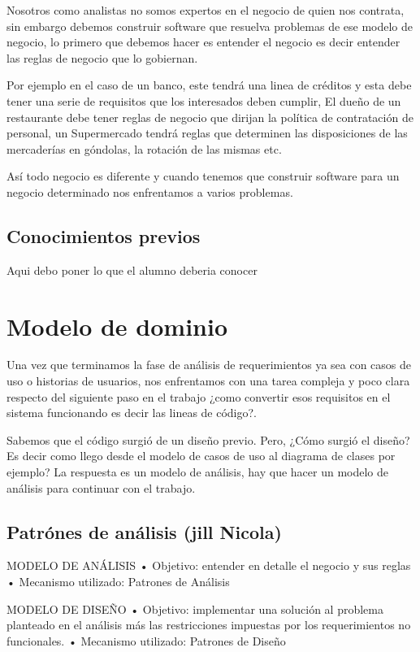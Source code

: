 \documentclass[12pt]{book}
\begin{document}
Nosotros como analistas no somos expertos en el negocio de quien nos contrata, sin embargo debemos construir software que resuelva problemas de ese modelo de negocio, lo primero que debemos hacer es entender el negocio es decir entender las reglas de negocio que lo gobiernan.

Por ejemplo en el caso de un banco, este tendrá una linea de créditos y esta debe tener una serie de requisitos que los interesados deben cumplir,  El dueño de un restaurante debe tener reglas de negocio que dirijan la política de contratación de personal, un Supermercado tendrá reglas que determinen las disposiciones de las mercaderías en góndolas, la rotación de las mismas etc.

Así todo negocio es diferente y cuando tenemos que construir software para un negocio determinado nos enfrentamos a varios problemas.

\section{Conocimientos previos}
Aqui debo poner lo que el alumno deberia conocer


\chapter{Modelo de dominio}
Una vez que terminamos la fase de análisis de requerimientos ya sea con casos de uso o historias de usuarios, nos enfrentamos con una tarea compleja y poco clara respecto del siguiente paso en el trabajo ¿como convertir esos requisitos en el sistema funcionando es decir las lineas de código?.

Sabemos que el código surgió de un diseño previo. Pero, ¿Cómo surgió el diseño? Es decir como llego desde el modelo de casos de uso al diagrama de clases por ejemplo?
La respuesta es un modelo de análisis, hay que hacer un modelo de análisis para continuar con el trabajo.


\section{Patr\'ones de análisis (jill Nicola)}

MODELO DE ANÁLISIS 
• Objetivo: entender en detalle el negocio y sus reglas 
• Mecanismo utilizado: Patrones de Análisis 


MODELO DE DISEÑO 
• Objetivo: implementar una solución al problema planteado en el análisis más las restricciones impuestas por los requerimientos no funcionales. 
• Mecanismo utilizado: Patrones de Diseño 
\end{document}
